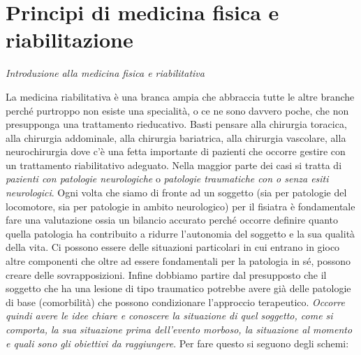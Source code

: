 \documentclass[]{article}
\date{}
\begin{document}
\section{Principi di medicina fisica e
riabilitazione}\label{principi-di-medicina-fisica-e-riabilitazione}

\emph{Introduzione} \emph{alla medicina fisica e riabilitativa}

La medicina riabilitativa è una branca ampia che abbraccia tutte le
altre branche perché purtroppo non esiste una specialità, o ce ne sono
davvero poche, che non presupponga una trattamento rieducativo. Basti
pensare alla chirurgia toracica, alla chirurgia addominale, alla
chirurgia bariatrica, alla chirurgia vascolare, alla neurochirurgia dove
c'è una fetta importante di pazienti che occorre gestire con un
trattamento riabilitativo adeguato. Nella maggior parte dei casi si
tratta di \emph{pazienti con patologie neurologiche} o \emph{patologie
traumatiche con o senza esiti neurologici}. Ogni volta che siamo di
fronte ad un soggetto (sia per patologie del locomotore, sia per
patologie in ambito neurologico) per il fisiatra è fondamentale fare una
valutazione ossia un bilancio accurato perché occorre definire quanto
quella patologia ha contribuito a ridurre l'autonomia del soggetto e la
sua qualità della vita. Ci possono essere delle situazioni particolari
in cui entrano in gioco altre componenti che oltre ad essere
fondamentali per la patologia in sé, possono creare delle
sovrapposizioni. Infine dobbiamo partire dal presupposto che il soggetto
che ha una lesione di tipo traumatico potrebbe avere già delle patologie
di base (comorbilità) che possono condizionare l'approccio terapeutico.
\emph{Occorre quindi avere le idee chiare e conoscere la situazione di
quel soggetto, come si comporta, la sua situazione prima dell'evento
morboso, la situazione al momento e quali sono gli obiettivi da
raggiungere}. Per fare questo si seguono degli schemi:
\end{document}

